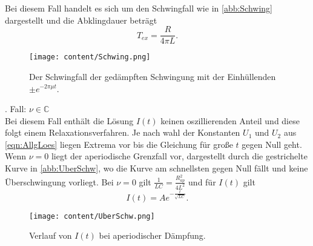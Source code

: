 Bei diesem Fall handelt es sich um den Schwingfall wie in \autoref{abb:Schwing} dargestellt und die Abklingdauer beträgt
\begin{equation}
    T_{ex} = \frac{R}{4\pi L}.
\end{equation}
\begin{figure}[H]
    \centering
    \texttt{[image: content/Schwing.png]}
    \caption{Der Schwingfall der gedämpften Schwingung mit der Einhüllenden $\pm e^{-2\pi\mu t}$. \cite{sample}}
    \label{abb:Schwing}
\end{figure}
. Fall: $\nu\in\mathbb{C}$\\
Bei diesem Fall enthält die Lösung $I(t)$ keinen oszillierenden Anteil und diese folgt einem Relaxationsverfahren.
Je nach wahl der Konstanten $U_1$ und $U_2$ aus \eqref{eqn:AllgLoes} liegen Extrema vor bis die Gleichung für große
$t$ gegen Null geht. Wenn $\nu = 0$ liegt der aperiodische Grenzfall vor, dargestellt durch die gestrichelte Kurve in
\autoref{abb:UberSchw}, wo die Kurve am schnellsten gegen Null fällt und keine Überschwingung vorliegt. Bei $\nu = 0$ gilt
$\frac{1}{LC} = \frac{R^2_{ap}}{4L^2}$ und für $I(t)$ gilt
\begin{equation}
    I(t) = Ae^{-\frac{t}{\sqrt{LC}}}.
\end{equation}
\begin{figure}[H]
    \centering
    \texttt{[image: content/UberSchw.png]}
    \caption{Verlauf von $I(t)$ bei aperiodischer Dämpfung. \cite{sample}}
    \label{abb:UberSchw}
\end{figure}
